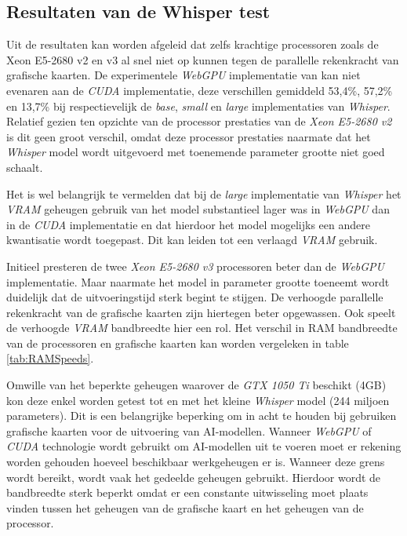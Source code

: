 
\subsection{Resultaten van de Whisper test}

Uit de resultaten kan worden afgeleid dat zelfs krachtige processoren zoals de Xeon E5-2680 v2 en v3 al snel niet op kunnen tegen de parallelle rekenkracht van grafische kaarten. De experimentele \textit{WebGPU} implementatie van \textcite{Fleetwood2024} kan niet evenaren aan de \textit{CUDA} implementatie, deze verschillen gemiddeld 53,4\%, 57,2\% en 13,7\% bij respectievelijk de \textit{base}, \textit{small} en \textit{large} implementaties van \textit{Whisper}. Relatief gezien ten opzichte van de processor prestaties van de \textit{Xeon E5-2680 v2} is dit geen groot verschil, omdat deze processor prestaties naarmate dat het \textit{Whisper} model wordt uitgevoerd met toenemende parameter grootte niet goed schaalt.

\bigbreak{}

Het is wel belangrijk te vermelden dat bij de \textit{large} implementatie van \textit{Whisper} het \textit{VRAM} geheugen gebruik van het model substantieel lager was in \textit{WebGPU} dan in de \textit{CUDA} implementatie en dat hierdoor het model mogelijks een andere kwantisatie wordt toegepast. Dit kan leiden tot een verlaagd \textit{VRAM} gebruik.

\bigbreak{}

Initieel presteren de twee \textit{Xeon E5-2680 v3} processoren beter dan de \textit{WebGPU} implementatie. Maar naarmate het model in parameter grootte toeneemt wordt duidelijk dat de uitvoeringstijd sterk begint te stijgen. De verhoogde parallelle rekenkracht van de grafische kaarten zijn hiertegen beter opgewassen. Ook speelt de verhoogde \textit{VRAM} bandbreedte hier een rol. Het verschil in RAM bandbreedte van de processoren en grafische kaarten kan worden vergeleken in table \ref{tab:RAMSpeeds}. 

\bigbreak{}

Omwille van het beperkte geheugen waarover de \textit{GTX 1050 Ti} beschikt (4GB) kon deze enkel worden getest tot en met het kleine \textit{Whisper} model (244 miljoen parameters). Dit is een belangrijke beperking om in acht te houden bij gebruiken grafische kaarten voor de uitvoering van AI-modellen. Wanneer \textit{WebGPU} of \textit{CUDA} technologie wordt gebruikt om AI-modellen uit te voeren moet er rekening worden gehouden hoeveel beschikbaar werkgeheugen er is. Wanneer deze grens wordt bereikt, wordt vaak het gedeelde geheugen gebruikt. Hierdoor wordt de bandbreedte sterk beperkt omdat er een constante uitwisseling moet plaats vinden tussen het geheugen van de grafische kaart en het geheugen van de processor.

